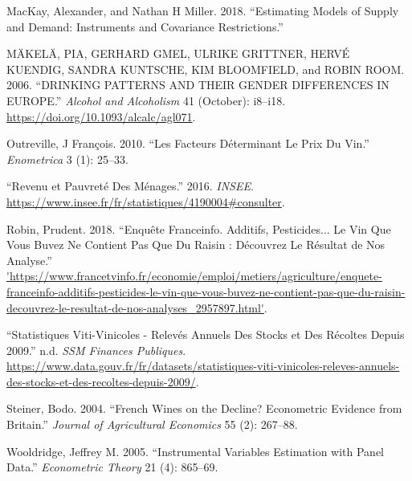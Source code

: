 \documentclass[11pt,]{article}
\begin{document}
\leavevmode\hypertarget{ref-mackay2018}{}%
MacKay, Alexander, and Nathan H Miller. 2018. ``Estimating Models of
Supply and Demand: Instruments and Covariance Restrictions.''

\leavevmode\hypertarget{ref-makela2006}{}%
MÄKELÄ, PIA, GERHARD GMEL, ULRIKE GRITTNER, HERVÉ KUENDIG, SANDRA
KUNTSCHE, KIM BLOOMFIELD, and ROBIN ROOM. 2006. ``DRINKING PATTERNS AND
THEIR GENDER DIFFERENCES IN EUROPE.'' \emph{Alcohol and Alcoholism} 41
(October): i8--i18. \url{https://doi.org/10.1093/alcalc/agl071}.

\leavevmode\hypertarget{ref-outreville2010}{}%
Outreville, J François. 2010. ``Les Facteurs Déterminant Le Prix Du
Vin.'' \emph{Enometrica} 3 (1): 25--33.

\leavevmode\hypertarget{ref-insee}{}%
``Revenu et Pauvreté Des Ménages.'' 2016. \emph{INSEE}.
\url{https://www.insee.fr/fr/statistiques/4190004\#consulter}.

\leavevmode\hypertarget{ref-Prudent2018}{}%
Robin, Prudent. 2018. ``Enquête Franceinfo. Additifs, Pesticides... Le
Vin Que Vous Buvez Ne Contient Pas Que Du Raisin : Découvrez Le Résultat
de Nos Analyse.''
\url{'https://www.francetvinfo.fr/economie/emploi/metiers/agriculture/enquete-franceinfo-additifs-pesticides-le-vin-que-vous-buvez-ne-contient-pas-que-du-raisin-decouvrez-le-resultat-de-nos-analyses_2957897.html'}.

\leavevmode\hypertarget{ref-ssm}{}%
``Statistiques Viti-Vinicoles - Relevés Annuels Des Stocks et Des
Récoltes Depuis 2009.'' n.d. \emph{SSM Finances Publiques}.
\url{https://www.data.gouv.fr/fr/datasets/statistiques-viti-vinicoles-releves-annuels-des-stocks-et-des-recoltes-depuis-2009/}.

\leavevmode\hypertarget{ref-steiner2004}{}%
Steiner, Bodo. 2004. ``French Wines on the Decline? Econometric Evidence
from Britain.'' \emph{Journal of Agricultural Economics} 55 (2):
267--88.

\leavevmode\hypertarget{ref-wooldridge2005instrumental}{}%
Wooldridge, Jeffrey M. 2005. ``Instrumental Variables Estimation with
Panel Data.'' \emph{Econometric Theory} 21 (4): 865--69.
\end{document}
